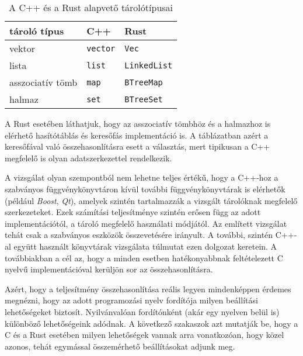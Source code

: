 \begin{table}
\centering
\begin{tabular}{|l|l|l|}
tároló típus & C++ & Rust \\
\hline
vektor & \texttt{vector} & \texttt{Vec} \\
lista & \texttt{list} & \texttt{LinkedList} \\
asszociatív tömb & \texttt{map} & \texttt{BTreeMap} \\
halmaz & \texttt{set} & \texttt{BTreeSet} \\
\hline
\end{tabular}
\caption{A C++ és a Rust alapvető tárolótípusai}
\label{tab:cpp_rust_containers}
\end{table}

A Rust esetében láthatjuk, hogy az asszociatív tömbhöz és a halmazhoz is elérhető hasítótáblás és keresőfás implementáció is. A táblázatban azért a keresőfával való összehasonlításra esett a választás, mert tipikusan a C++ megfelelő is olyan adatszerkezettel rendelkezik.

A vizsgálat olyan szempontból nem lehetne teljes értékű, hogy a C++-hoz a szabványos függvénykönyvtáron kívül további függvénykönyvtárak is elérhetők (például \textit{Boost}, \textit{Qt}), amelyek szintén tartalmazzák a vizsgált tárolóknak megfelelő szerkezeteket. Ezek számítási teljesítménye szintén erősen függ az adott implementációtól, a tároló megfelelő használati módjától. Az említett vizsgálat tehát csak a szabványos eszközök összevetésére irányult. A további, szintén C++-al együtt használt könyvtárak vizsgálata túlmutat ezen dolgozat keretein. A továbbiakban a cél az, hogy a minden esetben hatékonyabbnak feltételezett C nyelvű implementációval kerüljön sor az összehasonlításra.


Azért, hogy a teljesítmény összehasonlítása reális legyen mindenképpen érdemes megnézni, hogy az adott programozási nyelv fordítója milyen beállítási lehetőségeket biztosít. Nyilvánvalóan fordítónként (akár egy nyelven belül is) különböző lehetőségeink adódnak. A következő szakaszok azt mutatják be, hogy a C és a Rust esetében milyen lehetőségek vannak arra vonatkozóan, hogy közel azonos, tehát egymással összemérhető beállításokat adjunk meg.


